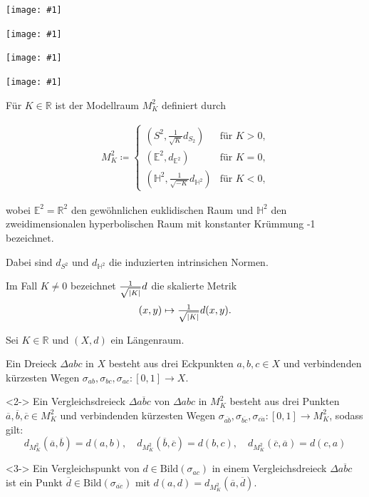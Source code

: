 \documentclass{beamer}
\newcommand{\E}{\mathbb{E}} %
\newcommand{\R}{\mathbb{R}} %
\newcommand{\HH}{\mathbb{H}} %
\newcommand{\Bild}{\mathrm{Bild}} %
\renewcommand{\emph}[1]{\textcolor{Emph}{#1}}
\DeclarePairedDelimiter\abs{\lvert}{\rvert}%
\theoremstyle{definition}
\newcommand{\framedgraphic}[1] {
  \begin{frame}
    \begin{center}
      \vspace{-10pt}
      \texttt{[image: \#1]}
    \end{center}
  \end{frame}
}
\begin{document}
\framedgraphic{bilder/sline-sm.jpg}
\framedgraphic{bilder/line2-ed.jpg}
\framedgraphic{bilder/line3-sm.jpg}
\framedgraphic{bilder/line4-sm.jpg}

\begin{frame}
  Für $K \in \R$ ist der Modellraum $M_K^2$ definiert durch

  \begin{align*}
    M_K^2 \coloneqq \begin{cases}
      (S^2, \tfrac{1}{\sqrt{K}} d_{S_2}) & \text{für $K > 0$,}\\
      (\E^2, d_{\E^2}) & \text{für $K = 0$,}\\
      (\HH^2, \tfrac{1}{\sqrt{-K}} d_{\HH^2}) & \text{für $K < 0$,}
    \end{cases}
  \end{align*}

  wobei $\E^2 = \R^2$ den gewöhnlichen euklidischen Raum und $\HH^2$ den zweidimensionalen hyperbolischen Raum mit konstanter Krümmung -1 bezeichnet.

  Dabei sind $d_{S^2}$ und $d_{\HH^2}$ die induzierten intrinsichen Normen.

  Im Fall $K \not= 0$ bezeichnet $\tfrac{1}{\sqrt{\abs{K}}} d$ die skalierte Metrik
  \[ (x, y) \mapsto \tfrac{1}{\sqrt{\abs{K}}} d(x, y). \]
\end{frame}


\begin{frame}
  Sei $K \in \R$ und $(X, d)$ ein Längenraum.

  \begin{definition}
    Ein \emph{Dreieck} $\Delta abc$ in $X$ besteht aus drei Eckpunkten $a, b, c \in X$ und verbindenden kürzesten Wegen $\sigma_{ab}, \sigma_{bc}, \sigma_{ac} : \left[0,1\right] \to X$.
  \end{definition}

  \begin{definition}<2->
    Ein \emph{Vergleichsdreieck} $\Delta \overline{abc}$ von $\Delta abc$ in $M_K^2$ besteht aus drei Punkten $\overline{a}, \overline{b}, \overline{c} \in M_K^2$ und verbindenden kürzesten Wegen $\sigma_{\overline{ab}}, \sigma_{\overline{bc}}, \sigma_{\overline{ca}} : \left[0,1\right] \to M_K^2$, sodass gilt:
    \[
      d_{M_K^2}(\overline{a}, \overline{b}) = d(a, b),
      \quad
      d_{M_K^2}(\overline{b}, \overline{c}) = d(b, c),
      \quad
      d_{M_K^2}(\overline{c}, \overline{a}) = d(c, a)
    \]
  \end{definition}

  \begin{definition}<3->
    Ein Vergleichspunkt von $d \in \Bild(\sigma_{ac})$ in einem Vergleichsdreieck $\Delta \overline{abc}$ ist ein Punkt $\overline{d} \in \Bild(\sigma_{\overline{ac}})$ mit $d(a, d) = d_{M_K^2}(\overline{a}, \overline{d})$.
  \end{definition}
\end{frame}
\end{document}
